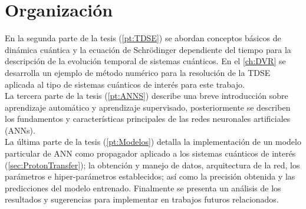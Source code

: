 \section{Organización}

En la segunda parte de la tesis (\autoref{pt:TDSE}) se abordan conceptos básicos de dinámica cuántica y la ecuación de Schrödinger dependiente del tiempo para la descripción de la evolución temporal de sistemas cuánticos. En el \autoref{ch:DVR} se desarrolla un ejemplo de método numérico para la resolución de la \acs{TDSE} aplicada al tipo de sistemas cuánticos de interés para este trabajo.\\

La tercera parte de la tesis (\autoref{pt:ANNS}) describe una breve introducción sobre aprendizaje automático y aprendizaje supervisado, posteriormente se describen los fundamentos y características principales de las redes neuronales artificiales (\acs{ANN}s).\\

La última parte de la tesis (\autoref{pt:Modelos}) detalla la implementación de un modelo particular de \acs{ANN} como propagador aplicado a los sistemas cuánticos de interés (\autoref{sec:ProtonTransfer}); la obtención y manejo de datos, arquitectura de la red, los parámetros e hiper-parámetros establecidos; así como la precisión obtenida y las predicciones del modelo entrenado. Finalmente se presenta un análisis de los resultados y sugerencias para implementar en trabajos futuros relacionados.









